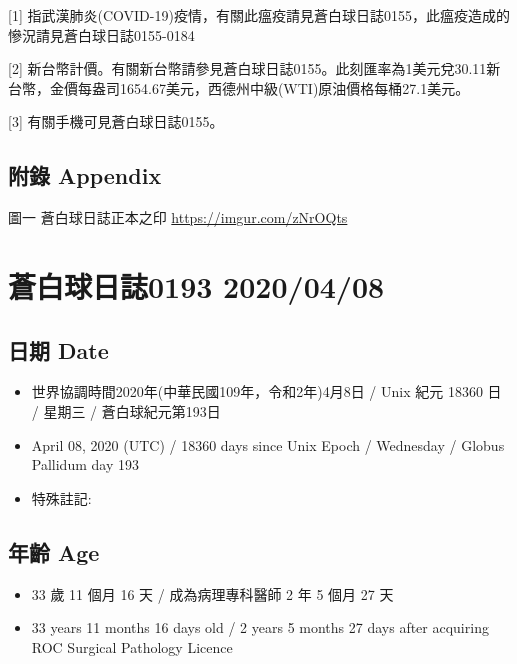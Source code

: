 \documentclass[a5paper, 11pt
]{book}
\providecommand{\tightlist}{%
  \setlength{\itemsep}{0pt}\setlength{\parskip}{0pt}}
\begin{document}
{[}1{]}
指武漢肺炎(COVID-19)疫情，有關此瘟疫請見蒼白球日誌0155，此瘟疫造成的慘況請見蒼白球日誌0155-0184

{[}2{]}
新台幣計價。有關新台幣請參見蒼白球日誌0155。此刻匯率為1美元兌30.11新台幣，金價每盎司1654.67美元，西德州中級(WTI)原油價格每桶27.1美元。

{[}3{]} 有關手機可見蒼白球日誌0155。

\hypertarget{ux9644ux9304-appendix-37}{%
\subsection{附錄 Appendix}\label{ux9644ux9304-appendix-37}}

圖一 蒼白球日誌正本之印 \url{https://imgur.com/zNrOQts}

\hypertarget{ux84bcux767dux7403ux65e5ux8a8c0193-20200408}{%
\section{蒼白球日誌0193
2020/04/08}\label{ux84bcux767dux7403ux65e5ux8a8c0193-20200408}}

\hypertarget{ux65e5ux671f-date-38}{%
\subsection{日期 Date}\label{ux65e5ux671f-date-38}}

\begin{itemize}
\tightlist
\item
  世界協調時間2020年(中華民國109年，令和2年)4月8日 / Unix 紀元 18360 日
  / 星期三 / 蒼白球紀元第193日
\item
  April 08, 2020 (UTC) / 18360 days since Unix Epoch / Wednesday /
  Globus Pallidum day 193
\item
  特殊註記:
\end{itemize}

\hypertarget{ux5e74ux9f61-age-38}{%
\subsection{年齡 Age}\label{ux5e74ux9f61-age-38}}

\begin{itemize}
\tightlist
\item
  33 歲 11 個月 16 天 / 成為病理專科醫師 2 年 5 個月 27 天
\item
  33 years 11 months 16 days old / 2 years 5 months 27 days after
  acquiring ROC Surgical Pathology Licence
\end{itemize}
\end{document}
